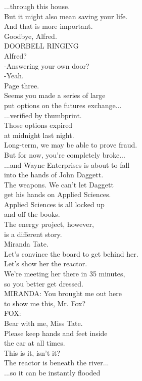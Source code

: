 \documentclass{article}
\begin{document}
\begin{multicols}{3}
...through this house.\\
But it might also mean saving your life.\\
And that is more important.\\
Goodbye, Alfred.\\
DOORBELL RINGING\\
Alfred?\\
-Answering your own door?\\
-Yeah.\\
Page three.\\
Seems you made a series of large\\
put options on the futures exchange...\\
...verified by thumbprint.\\
Those options expired\\
at midnight last night.\\
Long-term, we may be able to prove fraud.\\
But for now, you're completely broke...\\
...and Wayne Enterprises is about to fall\\
into the hands of John Daggett.\\
The weapons. We can't let Daggett\\
get his hands on Applied Sciences.\\
Applied Sciences is all locked up\\
and off the books.\\
The energy project, however,\\
is a different story.\\
Miranda Tate.\\
Let's convince the board to get behind her.\\
Let's show her the reactor.\\
We're meeting her there in 35 minutes,\\
so you better get dressed.\\
MIRANDA: You brought me out here\\
to show me this, Mr. Fox?\\
FOX:\\
Bear with me, Miss Tate.\\
Please keep hands and feet inside\\
the car at all times.\\
This is it, isn't it?\\
The reactor is beneath the river...\\
...so it can be instantly flooded\\

\end{multicols}
\end{document}

